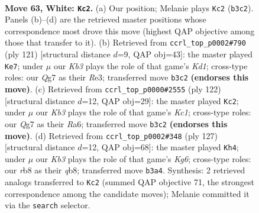 \documentclass[11pt]{article}
\begin{document}
\clearpage

\begin{figure}[p]\centering
\begin{subfigure}{0.46\textwidth}\centering
\resizebox{\linewidth}{!}{%
\newchessgame
\chessboard[
  setfen={1r6/6Q1/8/2k3P1/4P2P/1K6/8/8 w - - 11 63},
  showmover=false,
  pgfstyle=straightmove, color=movearrow, markmove={b3-c2}
]}
\caption{}
\end{subfigure}\hfill
\begin{subfigure}{0.46\textwidth}\centering
\resizebox{\linewidth}{!}{%
\newchessgame
\chessboard[
  setfen={3k2R1/8/3p4/1K1Pp3/8/4r3/8/8 b - - 13 61},
  showmover=false,
  pgfstyle=straightmove, color=movearrow, markmove={d8-e7}
]}
\caption{}
\end{subfigure}
\\[4pt]
\begin{subfigure}{0.46\textwidth}\centering
\resizebox{\linewidth}{!}{%
\newchessgame
\chessboard[
  setfen={8/3k4/R7/8/P7/2P5/8/2K1r3 w - - 17 62},
  showmover=false,
  pgfstyle=straightmove, color=movearrow, markmove={c1-c2}
]}
\caption{}
\end{subfigure}\hfill
\begin{subfigure}{0.46\textwidth}\centering
\resizebox{\linewidth}{!}{%
\newchessgame
\chessboard[
  setfen={1Q6/8/p1p5/P7/8/4K1k1/8/5q2 b - - 0 64},
  showmover=false,
  pgfstyle=straightmove, color=movearrow, markmove={g3-h4}
]}
\caption{}
\end{subfigure}
\caption{\textbf{Move 63, White: \texttt{Kc2}.} (a) Our position; Melanie plays \texttt{Kc2} (\texttt{b3c2}). Panels (b)--(d) are the retrieved master positions whose correspondence most drove this move (highest QAP objective among those that transfer to it). (b) Retrieved from \texttt{ccrl\_top\_p0002\#790} (ply 121) [structural distance $d$=9, QAP obj=43]: the master played \texttt{Ke7}; under $\mu$ our \emph{Kb3} plays the role of that game's \emph{Kd1}; cross-type roles: our \emph{Q}g7 as their \emph{R}e3; transferred move \texttt{b3c2} \textbf{(endorses this move)}. (c) Retrieved from \texttt{ccrl\_top\_p0000\#2555} (ply 122) [structural distance $d$=12, QAP obj=29]: the master played \texttt{Kc2}; under $\mu$ our \emph{Kb3} plays the role of that game's \emph{Kc1}; cross-type roles: our \emph{Q}g7 as their \emph{R}a6; transferred move \texttt{b3c2} \textbf{(endorses this move)}. (d) Retrieved from \texttt{ccrl\_top\_p0002\#348} (ply 127) [structural distance $d$=12, QAP obj=68]: the master played \texttt{Kh4}; under $\mu$ our \emph{Kb3} plays the role of that game's \emph{Kg6}; cross-type roles: our \emph{r}b8 as their \emph{q}b8; transferred move \texttt{b3a4}. Synthesis: 2 retrieved analogs transferred to \texttt{Kc2} (summed QAP objective 71, the strongest correspondence among the candidate moves); Melanie committed it via the \texttt{search} selector.}
\label{fig:thought-m124}
\end{figure}
\end{document}
